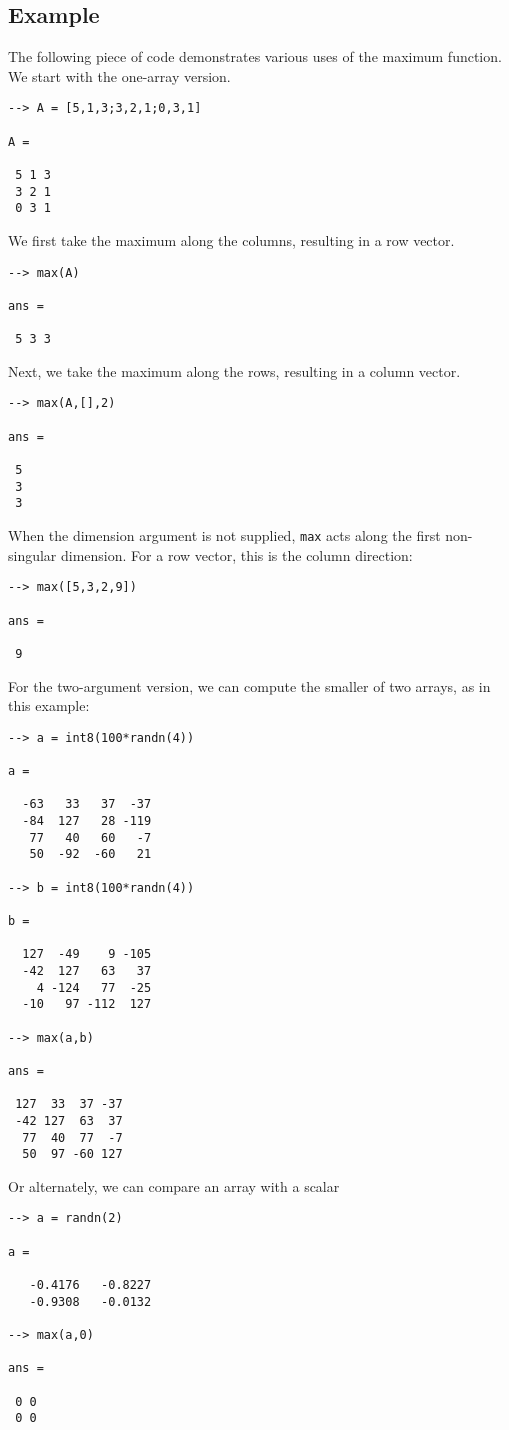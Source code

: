 \subsection{Example}

The following piece of code demonstrates various uses of the maximum
function.  We start with the one-array version.
\begin{verbatim}
--> A = [5,1,3;3,2,1;0,3,1]

A = 

 5 1 3 
 3 2 1 
 0 3 1 
\end{verbatim}
We first take the maximum along the columns, resulting in a row vector.
\begin{verbatim}
--> max(A)

ans = 

 5 3 3 
\end{verbatim}
Next, we take the maximum along the rows, resulting in a column vector.
\begin{verbatim}
--> max(A,[],2)

ans = 

 5 
 3 
 3 
\end{verbatim}
When the dimension argument is not supplied, \verb|max| acts along the first non-singular dimension.  For a row vector, this is the column direction:
\begin{verbatim}
--> max([5,3,2,9])

ans = 

 9 
\end{verbatim}

For the two-argument version, we can compute the smaller of two arrays,
as in this example:
\begin{verbatim}
--> a = int8(100*randn(4))

a = 

  -63   33   37  -37 
  -84  127   28 -119 
   77   40   60   -7 
   50  -92  -60   21 

--> b = int8(100*randn(4))

b = 

  127  -49    9 -105 
  -42  127   63   37 
    4 -124   77  -25 
  -10   97 -112  127 

--> max(a,b)

ans = 

 127  33  37 -37 
 -42 127  63  37 
  77  40  77  -7 
  50  97 -60 127 
\end{verbatim}
Or alternately, we can compare an array with a scalar
\begin{verbatim}
--> a = randn(2)

a = 

   -0.4176   -0.8227 
   -0.9308   -0.0132 

--> max(a,0)

ans = 

 0 0 
 0 0 
\end{verbatim}
